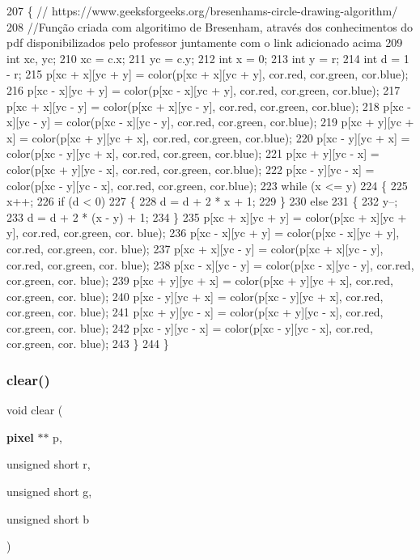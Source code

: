 \begin{DoxyCode}
207 \{ \textcolor{comment}{// https://www.geeksforgeeks.org/bresenhams-circle-drawing-algorithm/}
208     \textcolor{comment}{//Função criada com algoritimo de Bresenham, através dos conhecimentos do pdf disponibilizados pelo
       professor juntamente com o link adicionado acima}
209     \textcolor{keywordtype}{int} xc, yc;
210     xc = c.x;
211     yc = c.y;
212     \textcolor{keywordtype}{int} x = 0;
213     \textcolor{keywordtype}{int} y = r;
214     \textcolor{keywordtype}{int} d = 1 - r;
215     p[xc + x][yc + y] = color(p[xc + x][yc + y], cor.red, cor.green, cor.blue);
216     p[xc - x][yc + y] = color(p[xc - x][yc + y], cor.red, cor.green, cor.blue);
217     p[xc + x][yc - y] = color(p[xc + x][yc - y], cor.red, cor.green, cor.blue);
218     p[xc - x][yc - y] = color(p[xc - x][yc - y], cor.red, cor.green, cor.blue);
219     p[xc + y][yc + x] = color(p[xc + y][yc + x], cor.red, cor.green, cor.blue);
220     p[xc - y][yc + x] = color(p[xc - y][yc + x], cor.red, cor.green, cor.blue);
221     p[xc + y][yc - x] = color(p[xc + y][yc - x], cor.red, cor.green, cor.blue);
222     p[xc - y][yc - x] = color(p[xc - y][yc - x], cor.red, cor.green, cor.blue);
223     \textcolor{keywordflow}{while} (x <= y)
224     \{
225         x++;
226         \textcolor{keywordflow}{if} (d < 0)
227         \{
228             d = d + 2 * x + 1;
229         \}
230         \textcolor{keywordflow}{else}
231         \{
232             y--;
233             d = d + 2 * (x - y) + 1;
234         \}
235         p[xc + x][yc + y] = color(p[xc + x][yc + y], cor.red, cor.green, cor.
      blue);
236         p[xc - x][yc + y] = color(p[xc - x][yc + y], cor.red, cor.green, cor.
      blue);
237         p[xc + x][yc - y] = color(p[xc + x][yc - y], cor.red, cor.green, cor.
      blue);
238         p[xc - x][yc - y] = color(p[xc - x][yc - y], cor.red, cor.green, cor.
      blue);
239         p[xc + y][yc + x] = color(p[xc + y][yc + x], cor.red, cor.green, cor.
      blue);
240         p[xc - y][yc + x] = color(p[xc - y][yc + x], cor.red, cor.green, cor.
      blue);
241         p[xc + y][yc - x] = color(p[xc + y][yc - x], cor.red, cor.green, cor.
      blue);
242         p[xc - y][yc - x] = color(p[xc - y][yc - x], cor.red, cor.green, cor.
      blue);
243     \}
244 \}
\end{DoxyCode}
\mbox{\label{funcoes_8h_a2bcece9985f7e7311273e062ca608eab}} 
\subsubsection{clear()}
{\footnotesize\ttfamily void clear (\begin{DoxyParamCaption}\item[{\textbf{ pixel} $\ast$$\ast$}]{p,  }\item[{unsigned short}]{r,  }\item[{unsigned short}]{g,  }\item[{unsigned short}]{b }\end{DoxyParamCaption})}



